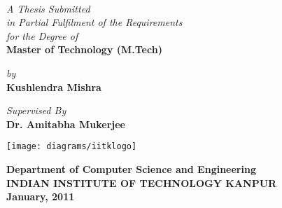 \titlepage
\thispagestyle{empty}
\begin{center}
\\
\end{center}\vspace{15mm}
\begin{center}
{\it{A Thesis Submitted}}\\
{\it{in Partial Fulfilment of the Requirements}}\\
{\it{for the Degree of}}\\

{\bf {\large Master of Technology (M.Tech)}}\\
\vspace{20mm}

{\it{by}} \\
{\bf{\large Kushlendra Mishra }}\\

\vspace{1cm}

{\it{Supervised By}} \\
{\large \bf {Dr. Amitabha Mukerjee}}\\

\end{center}
\vspace{10mm}
\begin{center}
\texttt{[image: diagrams/iitklogo]}
\end{center}
\begin{center}
\vspace{3mm}
{\bf {\large {\sc Department of Computer Science and Engineering}}}\\
\vspace{2mm}
{\bf {\large INDIAN INSTITUTE OF TECHNOLOGY KANPUR}}\\
\vspace{3mm}
{\textbf{ January, 2011}}\\
\end{center}

